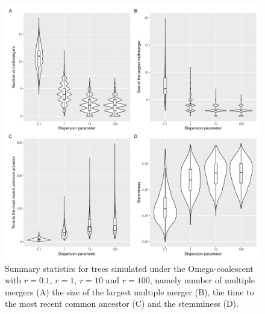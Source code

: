\documentclass{article}
\begin{document}
\begin{figure}[!p]
\begin{center}
\includegraphics[width=15cm]{../run/figureStats.pdf}
\end{center}
\caption{Summary statistics for trees simulated under the Omega-coalescent with $r=0.1$, $r=1$, $r=10$ and $r=100$, namely number of multiple mergers (A) the size of the largest multiple merger (B), the time to the most recent common ancestor (C) and the stemminess (D). 
\label{fig:stats}}
\end{figure}
\end{document}
